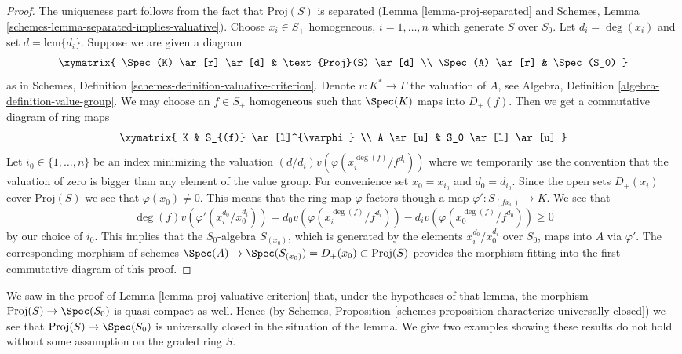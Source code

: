 \begin{proof}
The uniqueness part follows from the fact that $\text{Proj}(S)$ is
separated (Lemma \ref{lemma-proj-separated} and
Schemes, Lemma \ref{schemes-lemma-separated-implies-valuative}).
Choose $x_i \in S_{+}$ homogeneous, $i = 1, \ldots, n$
which generate $S$ over $S_0$. Let $d_i = \deg(x_i)$ and
set $d = \text{lcm}\{d_i\}$. Suppose we are given a diagram
$$
\xymatrix{
\Spec(K) \ar[r] \ar[d] & \text{Proj}(S) \ar[d] \\
\Spec(A) \ar[r] & \Spec(S_0)
}
$$
as in Schemes, Definition \ref{schemes-definition-valuative-criterion}.
Denote $v : K^* \to \Gamma$ the valuation of $A$, see
Algebra, Definition \ref{algebra-definition-value-group}.
We may choose an $f \in S_{+}$ homogeneous such that
$\Spec(K)$ maps into $D_{+}(f)$. Then we get a commutative
diagram of ring maps
$$
\xymatrix{
K & S_{(f)} \ar[l]^{\varphi} \\
A \ar[u] & S_0 \ar[l] \ar[u]
}
$$
Let $i_0 \in \{1, \ldots, n\}$ be an index minimizing the
valuation $(d/d_i)v(\varphi(x_i^{\deg(f)}/f^{d_i}))$ where we
temporarily use the convention that the valuation of zero
is bigger than any element of the value group.
For convenience set $x_0 = x_{i_0}$ and $d_0 = d_{i_0}$.
Since the open sets $D_{+}(x_i)$ cover $\text{Proj}(S)$
we see that $\varphi(x_0) \not = 0$. This means that
the ring map $\varphi$ factors though a map
$\varphi' : S_{(fx_0)} \to K$.
We see that
$$
\deg(f) v(\varphi'(x_i^{d_0}/x_0^{d_i})) =
d_0 v(\varphi(x_i^{\deg(f)}/f^{d_i})) -
d_i v(\varphi(x_0^{\deg(f)}/f^{d_0})) \geq 0
$$
by our choice of $i_0$. This implies that the $S_0$-algebra
$S_{(x_0)}$, which is generated by the elements
$x_i^{d_0}/x_0^{d_i}$ over $S_0$, maps into $A$ via $\varphi'$.
The corresponding morphism of schemes
$\Spec(A) \to \Spec(S_{(x_0)}) = D_{+}(x_0)
\subset \text{Proj}(S)$ provides the morphism fitting into
the first commutative diagram of this proof.
\end{proof}

\noindent
We saw in the proof of Lemma \ref{lemma-proj-valuative-criterion}
that, under the hypotheses of that lemma, the morphism
$\text{Proj}(S) \to \Spec(S_0)$ is quasi-compact as well. Hence (by
Schemes, Proposition \ref{schemes-proposition-characterize-universally-closed})
we see that $\text{Proj}(S) \to \Spec(S_0)$ is universally closed in
the situation of the lemma. We give two examples showing these results
do not hold without some assumption on the graded ring $S$.

